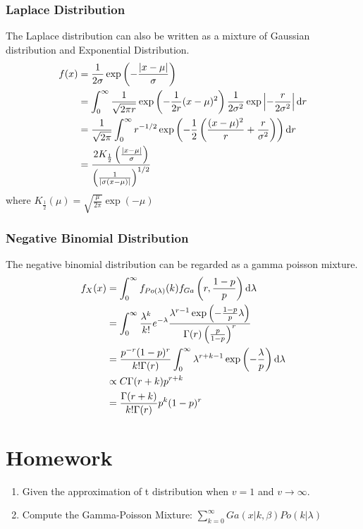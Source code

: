 		
		
		\subsubsection{Laplace Distribution}
		The Laplace distribution can also be written as a mixture of Gaussian distribution and Exponential Distribution.
		\begin{align*}
			f(x) & = \frac{1}{2\sigma}\exp\left(-\frac{|x-\mu|}{\sigma}\right)\\
			& = \int_{0}^{\infty} \frac{1}{\sqrt{2\pi r}} \exp\left(-\frac{1}{2r}(x-\mu)^2\right)\frac{1}{2\sigma^2}\exp\left|-\frac{r}{2\sigma^2}\right|\mathrm{d} r\\
			& = \frac{1}{\sqrt{2\pi}}\int_{0}^{\infty}r^{-1/2}\exp\left(-\frac{1}{2}\left(\frac{(x-\mu)^2}{r} + \frac{r}{\sigma^2}\right)\right)\mathrm{d} r\\
			& = \frac{2K_{\frac{1}{2}}\left(\frac{|x-\mu|}{\sigma}\right)}{\left(\frac{1}{\left|\sigma(x-\mu)\right|}\right)^{1/2}}
		\end{align*}
		where $K_{\frac{1}{2}}(\mu) = \sqrt{\frac{\mu}{2\pi}}\exp(-\mu)$
		
		
		\subsubsection{Negative Binomial Distribution}
		The negative binomial distribution can be regarded as a gamma poisson mixture.
		\begin{align*}
			f_X(x) & = \int_{0}^{\infty}f_{Po(\lambda)}(k)f_{Ga}\left(r, \frac{1-p}{p}\right)\mathrm{d} \lambda\\
			& = \int_{0}^{\infty}\frac{\lambda^k}{k!}e^{-\lambda}\frac{\lambda^{r-1}\exp\left(-\frac{1-p}{p}\lambda\right)}{\Gamma(r)\left(\frac{p}{1-p}\right)^r}\\
			& = \frac{p^{-r}(1-p)^r}{k!\Gamma(r)}\int_{0}^{\infty}\lambda^{r+k-1}\exp\left(-\frac{\lambda}{p}\right)\mathrm{d} \lambda\\
			& \propto C \Gamma(r+k)p^{r+k}\\
			& =\frac{\Gamma(r+k)}{k!\Gamma(r)}p^k(1-p)^r			
		\end{align*}

\section{Homework}
	\begin{enumerate}[(1)]
		\item Given the approximation of t distribution when $v=1$ and $v\to \infty$.
		\item Compute the Gamma-Poisson Mixture: $ \sum\limits_{k=0}^{\infty}Ga(x|k,\beta)Po(k|\lambda)$
	\end{enumerate}
	
	
	
	
	
	
	
	
	
	
	
	
	
	
	
	
	
	
	
	
	
	